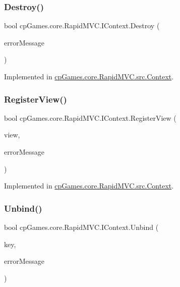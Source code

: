 \subsubsection{\texorpdfstring{Destroy()}{Destroy()}}
{\footnotesize\ttfamily bool cp\+Games.\+core.\+Rapid\+M\+V\+C.\+I\+Context.\+Destroy (\begin{DoxyParamCaption}\item[{out string}]{error\+Message }\end{DoxyParamCaption})}



Implemented in \mbox{\hyperlink{classcp_games_1_1core_1_1_rapid_m_v_c_1_1src_1_1_context_af533afc2087ed95d2c5123a3c69f66c5}{cp\+Games.\+core.\+Rapid\+M\+V\+C.\+src.\+Context}}.

\mbox{\label{interfacecp_games_1_1core_1_1_rapid_m_v_c_1_1_i_context_a975a12d7037f6425755b27feeeafb155}} 
\subsubsection{\texorpdfstring{RegisterView()}{RegisterView()}}
{\footnotesize\ttfamily bool cp\+Games.\+core.\+Rapid\+M\+V\+C.\+I\+Context.\+Register\+View (\begin{DoxyParamCaption}\item[{\mbox{\hyperlink{interfacecp_games_1_1core_1_1_rapid_m_v_c_1_1_i_view}{I\+View}}}]{view,  }\item[{out string}]{error\+Message }\end{DoxyParamCaption})}



Implemented in \mbox{\hyperlink{classcp_games_1_1core_1_1_rapid_m_v_c_1_1src_1_1_context_a382256a6867b84c58d9c69b995423e63}{cp\+Games.\+core.\+Rapid\+M\+V\+C.\+src.\+Context}}.

\mbox{\label{interfacecp_games_1_1core_1_1_rapid_m_v_c_1_1_i_context_abfff82911155824da32f84d8647d9e56}} 
\subsubsection{\texorpdfstring{Unbind()}{Unbind()}}
{\footnotesize\ttfamily bool cp\+Games.\+core.\+Rapid\+M\+V\+C.\+I\+Context.\+Unbind (\begin{DoxyParamCaption}\item[{\mbox{\hyperlink{interfacecp_games_1_1core_1_1_rapid_m_v_c_1_1_i_binding_key}{I\+Binding\+Key}}}]{key,  }\item[{out string}]{error\+Message }\end{DoxyParamCaption})}



